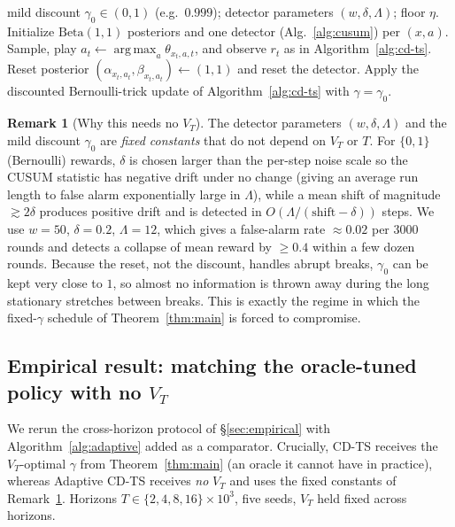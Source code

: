 \documentclass[11pt]{article}
\theoremstyle{definition}
\newtheorem{remark}{Remark}
\newcommand{\Beta}{\mathrm{Beta}}
\DeclareMathOperator*{\argmax}{arg\,max}
\begin{document}
\begin{algorithm}[h]
\caption{Adaptive CD-TS (no $V_T$)}
\label{alg:adaptive}
\begin{algorithmic}[1]
\Require mild discount $\gamma_0 \in (0,1)$ (e.g.\ $0.999$); detector parameters $(w,\delta,\Lambda)$; floor $\eta$.
\State Initialize $\Beta(1,1)$ posteriors and one detector (Alg.~\ref{alg:cusum}) per $(x,a)$.
    \State Sample, play $a_t \gets \argmax_a \theta_{x_t,a,t}$, and observe $r_t$ as in Algorithm~\ref{alg:cd-ts}.
        \State Reset posterior $(\alpha_{x_t,a_t},\beta_{x_t,a_t}) \gets (1,1)$ and reset the detector. 
    \Else
        \State Apply the discounted Bernoulli-trick update of Algorithm~\ref{alg:cd-ts} with $\gamma = \gamma_0$.
    \EndIf
\EndFor
\end{algorithmic}
\end{algorithm}

\begin{remark}[Why this needs no $V_T$]
\label{rem:no-vt}
The detector parameters $(w,\delta,\Lambda)$ and the mild discount $\gamma_0$
are \emph{fixed constants} that do not depend on $V_T$ or $T$. For $\{0,1\}$
(Bernoulli) rewards, $\delta$ is chosen larger than the per-step noise scale so
the CUSUM statistic has negative drift under no change (giving an average run
length to false alarm exponentially large in $\Lambda$), while a mean shift of
magnitude $\gtrsim 2\delta$ produces positive drift and is detected in
$O(\Lambda/(\text{shift}-\delta))$ steps. We use $w=50$, $\delta=0.2$,
$\Lambda=12$, which gives a false-alarm rate $\approx 0.02$ per $3000$ rounds
and detects a collapse of mean reward by $\geq 0.4$ within a few dozen rounds.
Because the reset, not the discount, handles abrupt breaks, $\gamma_0$ can be
kept very close to $1$, so almost no information is thrown away during the long
stationary stretches between breaks. This is exactly the regime in which the
fixed-$\gamma$ schedule of Theorem~\ref{thm:main} is forced to compromise.
\end{remark}

\subsection{Empirical result: matching the oracle-tuned policy with no $V_T$}

We rerun the cross-horizon protocol of \S\ref{sec:empirical} with
Algorithm~\ref{alg:adaptive} added as a comparator. Crucially, CD-TS receives
the $V_T$-optimal $\gamma$ from Theorem~\ref{thm:main} (an oracle it cannot have
in practice), whereas Adaptive CD-TS receives \emph{no} $V_T$ and uses the fixed
constants of Remark~\ref{rem:no-vt}. Horizons $T \in \{2,4,8,16\}{\times}10^3$,
five seeds, $V_T$ held fixed across horizons.
\end{document}
